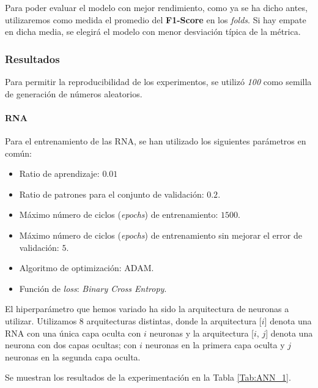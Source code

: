 \documentclass[12pt]{article}
\begin{document}
\bigskip
Para poder evaluar el modelo con mejor rendimiento, como ya se ha dicho antes, utilizaremos como medida el promedio
del \textbf{F1-Score} en los \textit{folds}. Si hay empate en dicha media, se elegirá el modelo con menor
desviación típica de la métrica.

\subsubsection{Resultados}
Para permitir la reproducibilidad de los experimentos, se utilizó \textit{100} como semilla de generación de números
aleatorios.

\paragraph{RNA}

Para el entrenamiento de las RNA, se han utilizado los siguientes parámetros en común:
\begin{itemize}
	\item Ratio de aprendizaje: $0.01$
	\item Ratio de patrones para el conjunto de validación: $0.2$.
	\item Máximo número de ciclos (\textit{epochs}) de entrenamiento: $1500$.
	\item Máximo número de ciclos (\textit{epochs}) de entrenamiento sin mejorar el error de validación: $5$.
	\item Algoritmo de optimización: ADAM.
	\item Función de \textit{loss}: \textit{Binary Cross Entropy}.
\end{itemize}

El hiperparámetro que hemos variado ha sido la arquitectura de neuronas a utilizar.
Utilizamos 8 arquitecturas distintas,
donde la arquitectura [$i$] denota una RNA con una única capa oculta con $i$ neuronas y la arquitectura [$i$, $j$] 
denota una neurona con dos capas ocultas; con $i$ neuronas en la primera capa oculta y $j$ neuronas en la segunda capa oculta.

Se muestran los resultados de la experimentación en la Tabla \ref{Tab:ANN_1}.
\end{document}
